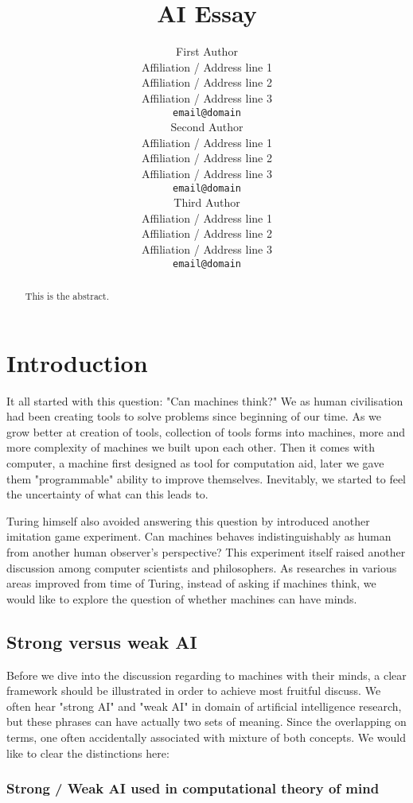 \documentclass[11pt]{article}
\title{AI Essay}
\author{First Author \\
  Affiliation / Address line 1 \\
  Affiliation / Address line 2 \\
  Affiliation / Address line 3 \\
  {\tt email@domain} \\\And
  Second Author \\
  Affiliation / Address line 1 \\
  Affiliation / Address line 2 \\
  Affiliation / Address line 3 \\
  {\tt email@domain} \\\And
  Third Author \\
  Affiliation / Address line 1 \\
  Affiliation / Address line 2 \\
  Affiliation / Address line 3 \\
  {\tt email@domain} \\}
\date{}
\begin{document}
\maketitle
\begin{abstract}
This is the abstract.
\end{abstract}

\section{Introduction}
\label{sec:introduction}

It all started with this question: "Can machines think?" We as human civilisation had been creating tools to solve problems since beginning of our time. As we grow better at creation of tools, collection of tools forms into machines, more and more complexity of machines we built upon each other. Then it comes with computer, a machine first designed as tool for computation aid, later we gave them "programmable" ability to improve themselves. Inevitably, we started to feel the uncertainty of what can this leads to.

Turing himself also avoided answering this question by introduced another imitation game experiment. Can machines behaves indistinguishably as human from another human observer's perspective? This experiment itself raised another discussion among computer scientists and philosophers. As researches in various areas improved from time of Turing, instead of asking if machines think, we would like to explore the question of whether machines can have minds.

\subsection{Strong versus weak AI}

Before we dive into the discussion regarding to machines with their minds, a clear framework should be illustrated in order to achieve most fruitful discuss. We often hear "strong AI" and "weak AI" in domain of artificial intelligence research, but these phrases can have actually two sets of meaning. Since the overlapping on terms, one often accidentally associated with mixture of both concepts. We would like to clear the distinctions here: 

\subsubsection{Strong / Weak AI used in computational theory of mind}
\end{document}
